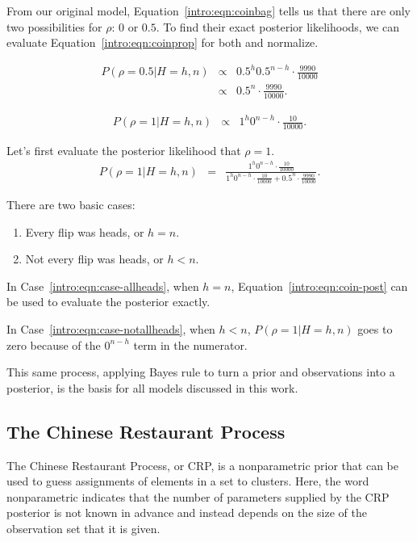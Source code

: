 From our original model, Equation~\ref{intro:eqn:coinbag} tells us that there are only two possibilities for $\rho$: $0$ or $0.5$. To find their exact posterior likelihoods, we can evaluate Equation~\ref{intro:eqn:coinprop} for both and normalize.

\begin{eqnarray}
P(\rho=0.5|H=h,n) & \propto & {0.5}^h {0.5}^{n-h} \cdot \frac{9990}{10000}\\
& \propto & {0.5}^n \cdot \frac{9990}{10000}.
\end{eqnarray}

\begin{eqnarray}
P(\rho=1|H=h,n) & \propto &  1^h 0^{n-h} \cdot \frac{10}{10000}.
\end{eqnarray}

Let's first evaluate the posterior likelihood that $\rho=1$.
\begin{eqnarray}
\label{intro:eqn:coin-post}P(\rho=1|H=h,n) & = & \frac{1^h 0^{n-h} \cdot \frac{10}{10000}}{1^h 0^{n-h} \cdot \frac{10}{10000}+{0.5}^n \cdot \frac{9990}{10000}}.
\end{eqnarray}

There are two basic cases:
\begin{enumerate}
\item \label{intro:eqn:case-allheads} Every flip was heads, or $h=n$.
\item \label{intro:eqn:case-notallheads} Not every flip was heads, or $h<n$.
\end{enumerate}

In Case~\ref{intro:eqn:case-allheads}, when $h=n$, Equation~\ref{intro:eqn:coin-post} can be used to evaluate the posterior exactly.

In Case~\ref{intro:eqn:case-notallheads}, when $h<n$, $P(\rho=1|H=h,n)$ goes to zero because of the $0^{n-h}$ term in the numerator.

This same process, applying Bayes rule to turn a prior and observations into a posterior, is the basis for all models discussed in this work.

\subsection{The Chinese Restaurant Process}

The Chinese Restaurant Process, or CRP, is a nonparametric prior that can be used to guess assignments of elements in a set to clusters\note{[ref]}. Here, the word nonparametric indicates that the number of parameters supplied by the CRP posterior is not known in advance and instead depends on the size of the observation set that it is given.


